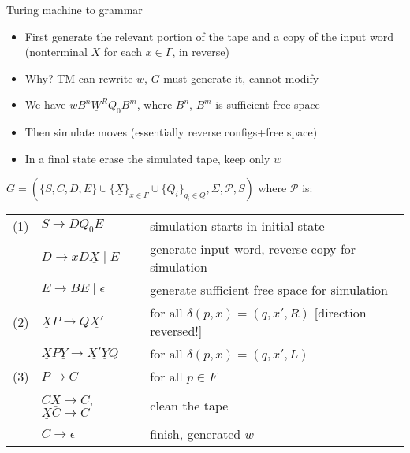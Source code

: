 \documentclass[handout]{beamer}
\begin{document}
\begin{frame}{Turing machine to grammar}
    
    \begin{itemize}
        \item First generate the relevant portion of the tape and a copy of the input word (nonterminal $\underline{X}$ for each $x\in\Gamma$, in 
        reverse)
        \item Why? TM can rewrite $w$, $G$ must generate it, cannot modify
        \item We have \alert{$wB^n\underline{W}^RQ_0B^m$}, where $B^n$, $B^m$ is sufficient free space        
        \item Then simulate moves (essentially reverse configs+free space)
        \item In a final state erase the simulated tape, keep only $w$
    \end{itemize}
    {\small
    $G=(\{S,C,D,E\}\cup \{\underline{X}\}_{x\in \Gamma}\cup \{Q_i\}_{q_i \in Q},\Sigma,\mathcal P,S)$ where $\mathcal P$ is:
    
    \begin{tabular}{lll}
        (1) 
        & $S\rightarrow DQ_0E$ 
        & simulation starts in initial state 
        \\

        & $D\rightarrow xD\underline{X}\mid E$ 
        & generate input word, reverse copy for simulation
        \\

        & $E\rightarrow BE\mid\epsilon$ 
        & generate sufficient free space for simulation
        \\        
        (2)
        & $\underline{X}P \rightarrow Q\underline{X'} $ 
        & for all $\delta(p,x)=(q,x',R)$ [direction reversed!]
        \\

        & $\underline{X}P \underline{Y}\rightarrow \underline{X'} \underline{Y}Q$ 
        & for all $\delta(p,x)=(q,x',L)$
        \\
        (3) 
        & $P\rightarrow C$ 
        & for all $p\in F$
        \\

        & $C \underline{X}\rightarrow C$,$\underline{X} C\rightarrow C$ 
        & clean the tape
        \\
        
        & $C\rightarrow \epsilon$ 
        & finish, generated $w$
    \end{tabular}
    }

\end{frame}
\end{document}
